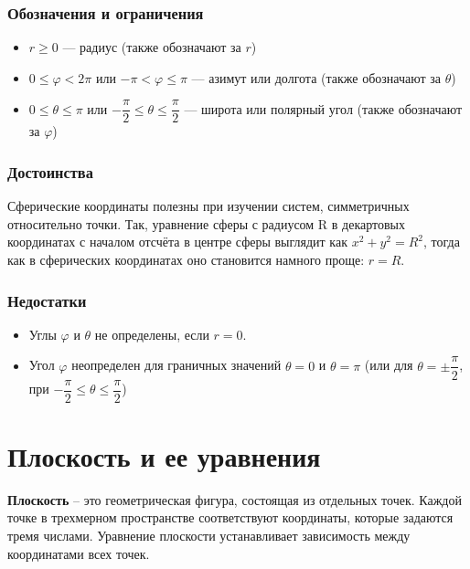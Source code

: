 \documentclass[a4paper,12pt]{extbook}
\theoremstyle{named}
\theoremstyle{named}
\begin{document}
\subsubsection*{Обозначения и ограничения}
\begin{itemize}
    \item {\(r \geq 0\) — радиус (также обозначают за \(r\))}
    \item {\(0 \leq \varphi < 2\pi\) или \(-\pi < \varphi \leq \pi\) — азимут или долгота (также обозначают за \(\theta\))}
    \item {\(0 \leq \theta \leq \pi\) или \(-\dfrac{\pi}{2} \leq \theta \leq \dfrac{\pi}{2}\) — широта или полярный угол (также обозначают за \(\varphi\))}
\end{itemize}

\subsubsection*{Достоинства}
Сферические координаты полезны при изучении систем, симметричных относительно точки. Так, уравнение сферы с радиусом R в декартовых координатах с началом отсчёта в центре сферы выглядит как \(x^2 + y^2 = R^2\), тогда как в сферических координатах оно становится намного проще: \(r = R\).

\subsubsection*{Недостатки}
\begin{itemize}
    \item Углы \(\varphi\) и \(\theta\) не определены, если \(r = 0\).
    \item Угол \(\varphi\) неопределен для граничных значений \(\theta = 0\) и \(\theta = \pi\) (или для \(\theta = \pm \dfrac{\pi}{2}\), при \(-\dfrac{\pi}{2} \leq \theta \leq \dfrac{\pi}{2}\))
\end{itemize}



\section{Плоскость и ее уравнения}\label{sec:plane}

\textbf{Плоскость} – это геометрическая фигура, состоящая из отдельных точек. Каждой точке в трехмерном пространстве соответствуют координаты, которые задаются тремя числами. Уравнение плоскости устанавливает зависимость между координатами всех точек.
\end{document}
